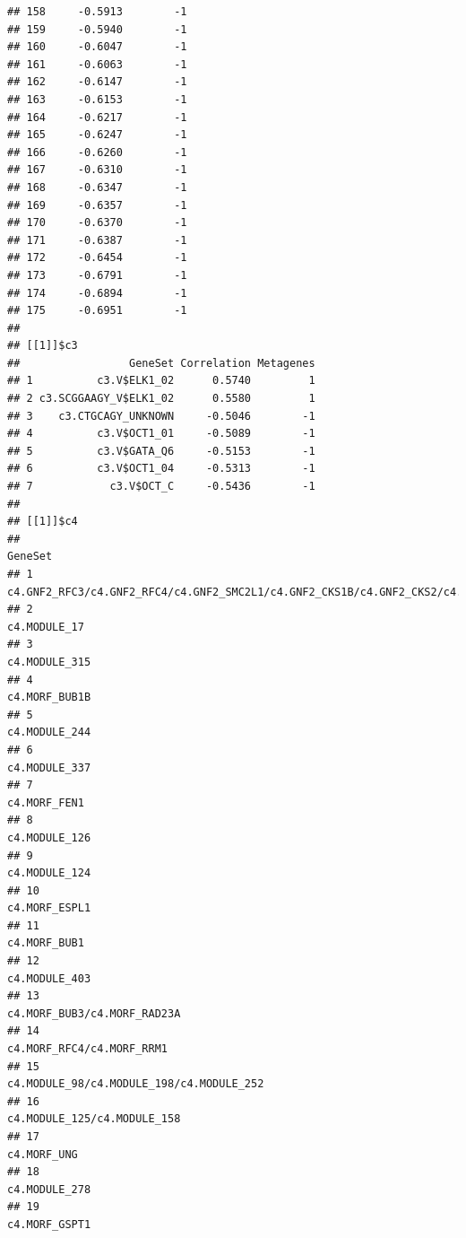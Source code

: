 \documentclass{article}\usepackage[]{graphicx}\usepackage[]{color}
\makeatletter
\newenvironment{kframe}{%
 \def\at@end@of@kframe{}%
 \ifinner\ifhmode%
  \def\at@end@of@kframe{\end{minipage}}%
  \begin{minipage}{\columnwidth}%
 \fi\fi%
 \def\FrameCommand##1{\hskip\@totalleftmargin \hskip-\fboxsep
 \colorbox{shadecolor}{##1}\hskip-\fboxsep
     \hskip-\linewidth \hskip-\@totalleftmargin \hskip\columnwidth}%
 \MakeFramed {\advance\hsize-\width
   \@totalleftmargin\z@ \linewidth\hsize
   \@setminipage}}%
 {\par\unskip\endMakeFramed%
 \at@end@of@kframe}
\newenvironment{knitrout}{}{} %
\makeatother
\begin{document}
\begin{knitrout}
\begin{kframe}
\begin{verbatim}
## 158     -0.5913        -1
## 159     -0.5940        -1
## 160     -0.6047        -1
## 161     -0.6063        -1
## 162     -0.6147        -1
## 163     -0.6153        -1
## 164     -0.6217        -1
## 165     -0.6247        -1
## 166     -0.6260        -1
## 167     -0.6310        -1
## 168     -0.6347        -1
## 169     -0.6357        -1
## 170     -0.6370        -1
## 171     -0.6387        -1
## 172     -0.6454        -1
## 173     -0.6791        -1
## 174     -0.6894        -1
## 175     -0.6951        -1
## 
## [[1]]$c3
##                 GeneSet Correlation Metagenes
## 1          c3.V$ELK1_02      0.5740         1
## 2 c3.SCGGAAGY_V$ELK1_02      0.5580         1
## 3    c3.CTGCAGY_UNKNOWN     -0.5046        -1
## 4          c3.V$OCT1_01     -0.5089        -1
## 5          c3.V$GATA_Q6     -0.5153        -1
## 6          c3.V$OCT1_04     -0.5313        -1
## 7            c3.V$OCT_C     -0.5436        -1
## 
## [[1]]$c4
##                                                                            GeneSet
## 1  c4.GNF2_RFC3/c4.GNF2_RFC4/c4.GNF2_SMC2L1/c4.GNF2_CKS1B/c4.GNF2_CKS2/c4.GNF2_TTK
## 2                                                                     c4.MODULE_17
## 3                                                                    c4.MODULE_315
## 4                                                                    c4.MORF_BUB1B
## 5                                                                    c4.MODULE_244
## 6                                                                    c4.MODULE_337
## 7                                                                     c4.MORF_FEN1
## 8                                                                    c4.MODULE_126
## 9                                                                    c4.MODULE_124
## 10                                                                   c4.MORF_ESPL1
## 11                                                                    c4.MORF_BUB1
## 12                                                                   c4.MODULE_403
## 13                                                     c4.MORF_BUB3/c4.MORF_RAD23A
## 14                                                       c4.MORF_RFC4/c4.MORF_RRM1
## 15                                        c4.MODULE_98/c4.MODULE_198/c4.MODULE_252
## 16                                                     c4.MODULE_125/c4.MODULE_158
## 17                                                                     c4.MORF_UNG
## 18                                                                   c4.MODULE_278
## 19                                                                   c4.MORF_GSPT1

\end{verbatim}
\end{kframe}
\end{knitrout}
\end{document}
